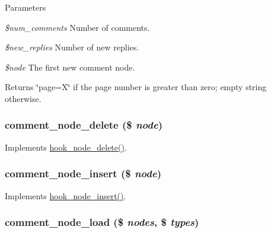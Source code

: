 \begin{DoxyParams}{Parameters}
\item[{\em \$num\_\-comments}]Number of comments. \item[{\em \$new\_\-replies}]Number of new replies. \item[{\em \$node}]The first new comment node. \end{DoxyParams}
\begin{DoxyReturn}{Returns}
\char`\"{}page=X\char`\"{} if the page number is greater than zero; empty string otherwise. 
\end{DoxyReturn}
\hypertarget{comment_8module_a39ec63a49e728160e7a6ee16cb94c98d}{
\subsubsection[{comment\_\-node\_\-delete}]{\setlength{\rightskip}{0pt plus 5cm}comment\_\-node\_\-delete (\$ {\em node})}}
\label{comment_8module_a39ec63a49e728160e7a6ee16cb94c98d}
Implements \hyperlink{group__node__api__hooks_ga66ea0473a9950dc961802e801e5042e9}{hook\_\-node\_\-delete()}. \hypertarget{comment_8module_ab1014a4769b972b796b1934da70fdf1f}{
\subsubsection[{comment\_\-node\_\-insert}]{\setlength{\rightskip}{0pt plus 5cm}comment\_\-node\_\-insert (\$ {\em node})}}
\label{comment_8module_ab1014a4769b972b796b1934da70fdf1f}
Implements \hyperlink{group__node__api__hooks_ga8b40dc62e46e5055c205d2a723dc3548}{hook\_\-node\_\-insert()}. \hypertarget{comment_8module_a3b04740955116c2ec6ec12db5f991d7c}{
\subsubsection[{comment\_\-node\_\-load}]{\setlength{\rightskip}{0pt plus 5cm}comment\_\-node\_\-load (\$ {\em nodes}, \/  \$ {\em types})}}
\label{comment_8module_a3b04740955116c2ec6ec12db5f991d7c}
